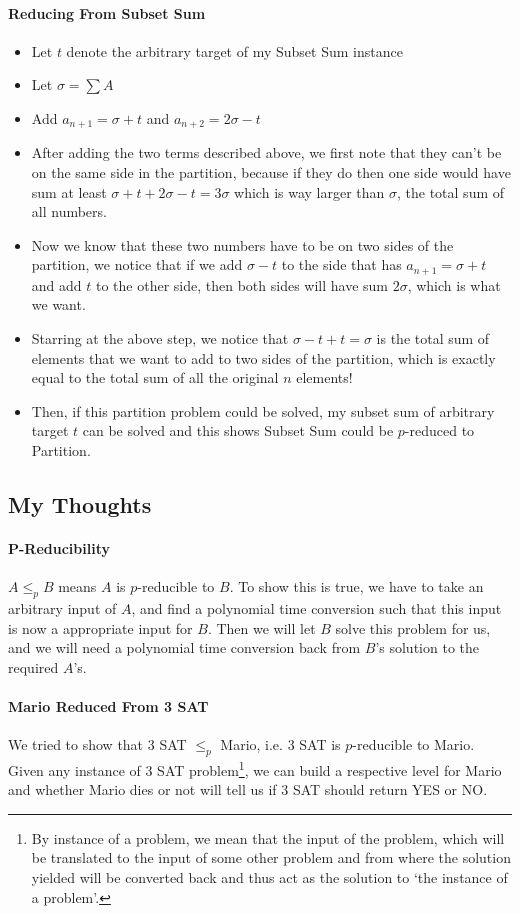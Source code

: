 \documentclass[10pt]{article}
\begin{document}
\paragraph{Reducing From Subset Sum}
\begin{itemize}
    \item Let $t$ denote the arbitrary target of my Subset Sum instance
    \item Let $\sigma = \sum A$
    \item Add $a_{n+1} = \sigma + t$ and $a_{n+2} = 2\sigma - t$
    \item After adding the two terms described above, we first note that they can't be on the same side in the partition, because if they do then one side would have sum at least $\sigma + t + 2\sigma - t = 3 \sigma$ which is way larger than $\sigma$, the total sum of all numbers. 
    \item Now we know that these two numbers have to be on two sides of the partition, we notice that if we add $\sigma - t$ to the side that has $a_{n+1} = \sigma + t$ and add $t$ to the other side, then both sides will have sum $2\sigma$, which is what we want. 
    \item Starring at the above step, we notice that $\sigma - t + t = \sigma$ is the total sum of elements that we want to add to two sides of the partition, which is exactly equal to the total sum of all the original $n$ elements! 
    \item Then, if this partition problem could be solved, my subset sum of arbitrary target $t$ can be solved and this shows Subset Sum could be $p$-reduced to Partition. 
\end{itemize}


\subsection{My Thoughts}
\paragraph{P-Reducibility} $A \leq_p B$ means $A$ is $p$-reducible to $B$. To show this is true, we have to take an arbitrary input of $A$, and find a polynomial time conversion such that this input is now a appropriate input for $B$. Then we will let $B$ solve this problem for us, and we will need a polynomial time conversion back from $B$'s solution to the required $A$'s. 

\paragraph{Mario Reduced From 3 SAT} We tried to show that 3 SAT $\leq_p$ Mario, i.e. 3 SAT is $p$-reducible to Mario. Given any instance of 3 SAT problem\footnote{By instance of a problem, we mean that the input of the problem, which will be translated to the input of some other problem and from where the solution yielded will be converted back and thus act as the solution to `the instance of a problem'.}, we can build a respective level for Mario and whether Mario dies or not will tell us if 3 SAT should return YES or NO. 
\end{document}
